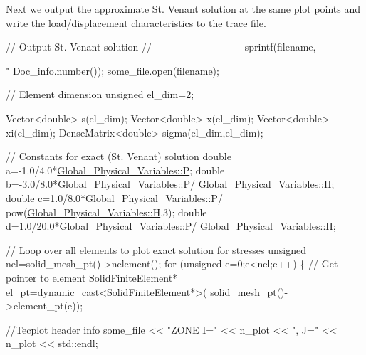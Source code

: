 Next we output the approximate St. Venant solution at the same plot points and write the load/displacement characteristics to the trace file.


\begin{DoxyCodeInclude}


 \textcolor{comment}{// Output St. Venant solution}
 \textcolor{comment}{//---------------------------}
 sprintf(filename,\textcolor{stringliteral}{"%
         Doc\_info.number());
 some\_file.open(filename);

 \textcolor{comment}{// Element dimension}
 \textcolor{keywordtype}{unsigned} el\_dim=2;
 
 Vector<double> s(el\_dim);
 Vector<double> x(el\_dim);
 Vector<double> xi(el\_dim);
 DenseMatrix<double> sigma(el\_dim,el\_dim);
 
 \textcolor{comment}{// Constants for exact (St. Venant) solution}
 \textcolor{keywordtype}{double} a=-1.0/4.0*\hyperlink{namespaceGlobal__Physical__Variables_a23c2ade6398f54040b869f7f3a2bcc4b}{Global\_Physical\_Variables::P};
 \textcolor{keywordtype}{double} b=-3.0/8.0*\hyperlink{namespaceGlobal__Physical__Variables_a23c2ade6398f54040b869f7f3a2bcc4b}{Global\_Physical\_Variables::P}/
      \hyperlink{namespaceGlobal__Physical__Variables_af6e07423e22c0991084d9a2f43727805}{Global\_Physical\_Variables::H};
 \textcolor{keywordtype}{double} c=1.0/8.0*\hyperlink{namespaceGlobal__Physical__Variables_a23c2ade6398f54040b869f7f3a2bcc4b}{Global\_Physical\_Variables::P}/
  pow(\hyperlink{namespaceGlobal__Physical__Variables_af6e07423e22c0991084d9a2f43727805}{Global\_Physical\_Variables::H},3);
 \textcolor{keywordtype}{double} d=1.0/20.0*\hyperlink{namespaceGlobal__Physical__Variables_a23c2ade6398f54040b869f7f3a2bcc4b}{Global\_Physical\_Variables::P}/
      \hyperlink{namespaceGlobal__Physical__Variables_af6e07423e22c0991084d9a2f43727805}{Global\_Physical\_Variables::H};

 \textcolor{comment}{// Loop over all elements to plot exact solution for stresses}
 \textcolor{keywordtype}{unsigned} nel=solid\_mesh\_pt()->nelement();
 \textcolor{keywordflow}{for} (\textcolor{keywordtype}{unsigned} e=0;e<nel;e++)
  \{   
   \textcolor{comment}{// Get pointer to element}
   SolidFiniteElement* el\_pt=\textcolor{keyword}{dynamic\_cast<}SolidFiniteElement*\textcolor{keyword}{>}(
    solid\_mesh\_pt()->element\_pt(e));
   
   \textcolor{comment}{//Tecplot header info }
   some\_file << \textcolor{stringliteral}{"ZONE I="} << n\_plot << \textcolor{stringliteral}{", J="} << n\_plot << std::endl;
   
}
\end{DoxyCodeInclude}

